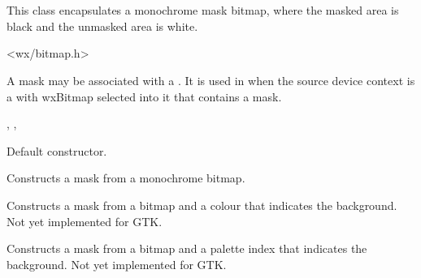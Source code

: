 \section{}\label{wxmask}

This class encapsulates a monochrome mask bitmap, where the masked area is black and
the unmasked area is white.




<wx/bitmap.h>


A mask may be associated with a . It is used in  when
the source device context is a  with wxBitmap selected into it that
contains a mask.


, , 


\label{wxmaskconstr}


Default constructor.


Constructs a mask from a monochrome bitmap.



Constructs a mask from a bitmap and a colour that indicates the background. Not
yet implemented for GTK.



Constructs a mask from a bitmap and a palette index that indicates the background. Not
yet implemented for GTK.




